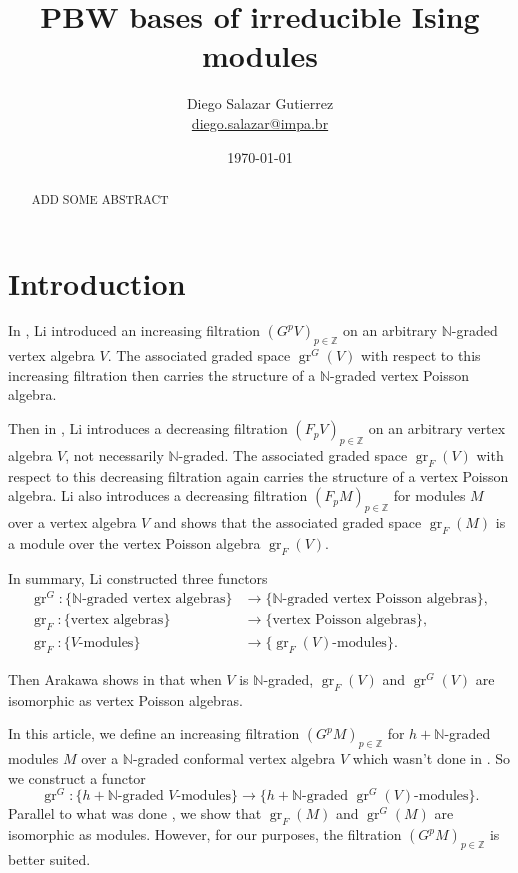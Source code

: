\documentclass[12pt, a4paper]{article}
\theoremstyle{remark}
\DeclareMathOperator{\gr}{gr}
\begin{document}
\title{PBW bases of irreducible Ising modules}
\author{Diego Salazar Gutierrez \\ \href{mailto:diego.salazar@impa.br}{diego.salazar@impa.br}}
\date{\today}
\maketitle

\begin{abstract}
  ADD SOME ABSTRACT
\end{abstract}

\section{Introduction}
\label{sec:introduction}

In \cite{li_vertex_2004}, Li introduced an increasing filtration $(G^pV)_{p\in \mathbb{Z}}$ on an arbitrary $\mathbb{N}$-graded vertex algebra $V$.
The associated graded space $\gr^G(V)$ with respect to this increasing filtration then carries the structure of a $\mathbb{N}$-graded vertex Poisson algebra.

Then in \cite{li_abelianizing_2005}, Li introduces a decreasing filtration $(F_pV)_{p\in \mathbb{Z}}$ on an arbitrary vertex algebra $V$, not necessarily $\mathbb{N}$-graded.
The associated graded space $\gr_F(V)$ with respect to this decreasing filtration again carries the structure of a vertex Poisson algebra.
Li also introduces a decreasing filtration $(F_pM)_{p\in \mathbb{Z}}$ for modules $M$ over a vertex algebra $V$ and shows that the associated graded space $\gr_F(M)$ is a module over the vertex Poisson algebra $\gr_F(V)$.

In summary, Li constructed three functors
\begin{align*}
  \gr^G: \{\text{$\mathbb{N}$-graded vertex algebras}\} &\to \{\text{$\mathbb{N}$-graded vertex Poisson algebras}\}, \\
  \gr_F: \{\text{vertex algebras}\} &\to \{\text{vertex Poisson algebras}\}, \\
  \gr_F: \{\text{$V$-modules}\} &\to \{\text{$\gr_F(V)$-modules}\}.
\end{align*}

Then Arakawa shows in \cite[Proposition 2.6.1]{arakawa_remark_2012} that when $V$ is $\mathbb{N}$-graded, $\gr_F(V)$ and $\gr^G(V)$ are isomorphic as vertex Poisson algebras.

In this article, we define an increasing filtration $(G^pM)_{p\in \mathbb{Z}}$ for $h + \mathbb{N}$-graded modules $M$ over a $\mathbb{N}$-graded conformal vertex algebra $V$ which wasn't done in \cite{li_vertex_2004}.
So we construct a functor
\begin{equation*}
  \gr^G: \{\text{$h + \mathbb{N}$-graded $V$-modules}\} \to \{\text{$h+\mathbb{N}$-graded $\gr^G(V)$-modules}\}.
\end{equation*}
Parallel to what was done \cite{arakawa_remark_2012}, we show that $\gr_F(M)$ and $\gr^G(M)$ are isomorphic as modules.
However, for our purposes, the filtration $(G^pM)_{p\in \mathbb{Z}}$ is better suited.
\end{document}
